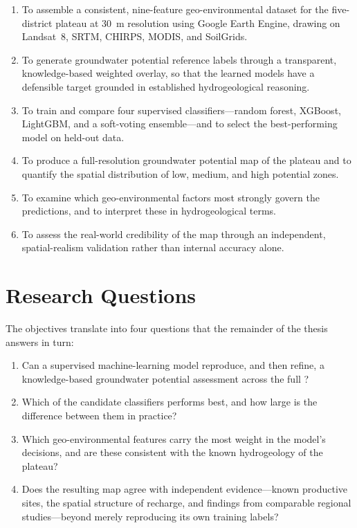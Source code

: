 \begin{enumerate}
  \item To assemble a consistent, nine-feature geo-environmental dataset for the
        five-district plateau at 30~m resolution using Google Earth Engine,
        drawing on Landsat~8, SRTM, CHIRPS, MODIS, and SoilGrids.
  \item To generate groundwater potential reference labels through a transparent,
        knowledge-based weighted overlay, so that the learned models have a
        defensible target grounded in established hydrogeological reasoning.
  \item To train and compare four supervised classifiers---random forest,
        XGBoost, LightGBM, and a soft-voting ensemble---and to select the
        best-performing model on held-out data.
  \item To produce a full-resolution groundwater potential map of the plateau and
        to quantify the spatial distribution of low, medium, and high potential
        zones.
  \item To examine which geo-environmental factors most strongly govern the
        predictions, and to interpret these in hydrogeological terms.
  \item To assess the real-world credibility of the map through an independent,
        spatial-realism validation rather than internal accuracy alone.
\end{enumerate}

\section{Research Questions}
\label{sec:questions}

The objectives translate into four questions that the remainder of the thesis
answers in turn:

\begin{enumerate}
  \item Can a supervised machine-learning model reproduce, and then refine, a
        knowledge-based groundwater potential assessment across the full
        \studyarea{}?
  \item Which of the candidate classifiers performs best, and how large is the
        difference between them in practice?
  \item Which geo-environmental features carry the most weight in the model's
        decisions, and are these consistent with the known hydrogeology of the
        plateau?
  \item Does the resulting map agree with independent evidence---known productive
        sites, the spatial structure of recharge, and findings from comparable
        regional studies---beyond merely reproducing its own training labels?
\end{enumerate}

